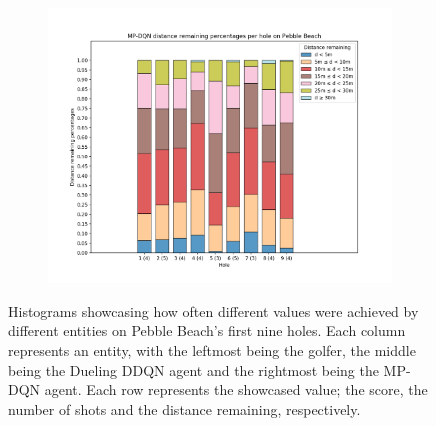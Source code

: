 \documentclass{kththesis}
\begin{document}
\begin{figure}
{\begin{subfigure}{0.3\paperwidth}
    \includegraphics[width=0.3\paperwidth]{AgentPercentages/MPDQN_Distance_Percentages_Pebble.png} 
    \end{subfigure}
    }
    \caption{Histograms showcasing how often different values were achieved by different entities on Pebble Beach's first nine holes. Each column represents an entity, with the leftmost being the golfer, the middle being the Dueling DDQN agent and the rightmost being the MP-DQN agent. Each row represents the showcased value; the score, the number of shots and the distance remaining, respectively.}
    \label{fig:pebble_histograms}
\end{figure}
\end{document}
